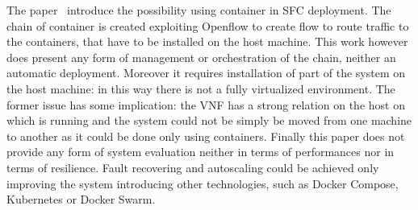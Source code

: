 The paper~\cite{kriti2017dnfc} introduce the possibility using container in SFC
deployment. The chain of container is created exploiting Openflow to create flow
to route traffic to the containers, that have to be installed on the host
machine. This work however does present any form of management or orchestration
of the chain, neither an automatic deployment. Moreover it requires installation
of part of the system on the host machine: in this way there is not a fully
virtualized environment. The former issue has some implication: the VNF has a
strong relation on the host on which is running and the system could not be
simply be moved from one machine to another as it could be done only using
containers. Finally this paper does not provide any form of system evaluation
neither in terms of performances nor in terms of resilience. Fault recovering
and autoscaling could be achieved only improving the system introducing other
technologies, such as Docker Compose, Kubernetes or Docker Swarm.






